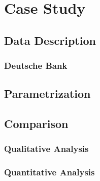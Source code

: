 \chapter{Case Study}\label{empiricalanalysis}

\section{Data Description}

\subsection{Deutsche Bank}

\section{Parametrization}

\section{Comparison}

\subsection{Qualitative Analysis}

\subsection{Quantitative Analysis}